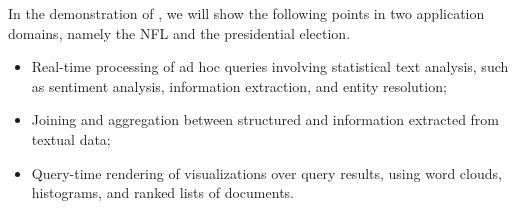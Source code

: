 
In the demonstration of \system, we will show the 
following points in two application domains, namely the NFL
and the presidential election.
\begin{itemize}
\item Real-time processing of ad hoc queries 
involving statistical text analysis, such as sentiment analysis,
information extraction, and entity resolution;
\item Joining and aggregation between structured and information extracted
from textual data;
\item Query-time rendering of visualizations over query results, using 
word clouds, histograms, and ranked lists of documents.
\end{itemize}

